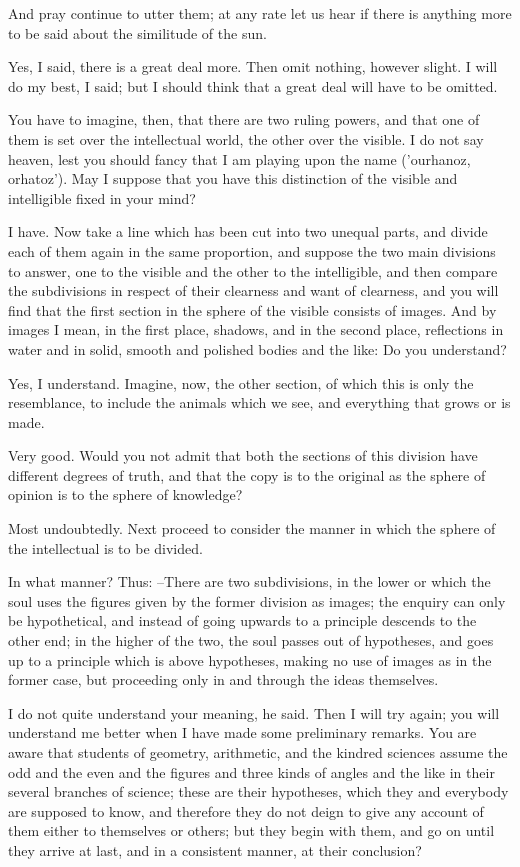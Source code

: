 And pray continue to utter them; at any rate let us hear if there is anything more to be said about the similitude of the sun.

Yes, I said, there is a great deal more.
Then omit nothing, however slight.
I will do my best, I said; but I should think that a great deal will have to be omitted.

You have to imagine, then, that there are two ruling powers, and that one of them is set over the intellectual world, the other over the visible. I do not say heaven, lest you should fancy that I am playing upon the name ('ourhanoz, orhatoz'). May I suppose that you have this distinction of the visible and intelligible fixed in your mind?

I have.
Now take a line which has been cut into two unequal parts, and divide each of them again in the same proportion, and suppose the two main divisions to answer, one to the visible and the other to the intelligible, and then compare the subdivisions in respect of their clearness and want of clearness, and you will find that the first section in the sphere of the visible consists of images. And by images I mean, in the first place, shadows, and in the second place, reflections in water and in solid, smooth and polished bodies and the like: Do you understand?

Yes, I understand.
Imagine, now, the other section, of which this is only the resemblance, to include the animals which we see, and everything that grows or is made.

Very good.
Would you not admit that both the sections of this division have different degrees of truth, and that the copy is to the original as the sphere of opinion is to the sphere of knowledge?

Most undoubtedly.
Next proceed to consider the manner in which the sphere of the intellectual is to be divided.

In what manner?
Thus: --There are two subdivisions, in the lower or which the soul uses the figures given by the former division as images; the enquiry can only be hypothetical, and instead of going upwards to a principle descends to the other end; in the higher of the two, the soul passes out of hypotheses, and goes up to a principle which is above hypotheses, making no use of images as in the former case, but proceeding only in and through the ideas themselves.

I do not quite understand your meaning, he said.
Then I will try again; you will understand me better when I have made some preliminary remarks. You are aware that students of geometry, arithmetic, and the kindred sciences assume the odd and the even and the figures and three kinds of angles and the like in their several branches of science; these are their hypotheses, which they and everybody are supposed to know, and therefore they do not deign to give any account of them either to themselves or others; but they begin with them, and go on until they arrive at last, and in a consistent manner, at their conclusion?

